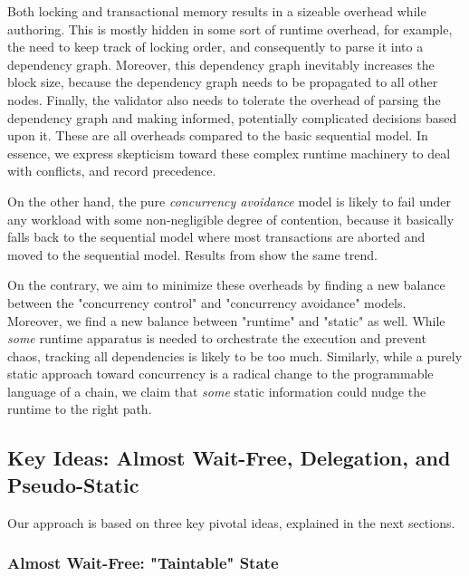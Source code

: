 Both locking and transactional memory results in a sizeable overhead while authoring. This is mostly
hidden in some sort of runtime overhead, for example, the need to keep track of locking order, and
consequently to parse it into a dependency graph. Moreover, this dependency graph inevitably
increases the block size, because the dependency graph needs to be propagated to all other nodes.
Finally, the validator also needs to tolerate the overhead of parsing the dependency graph and
making informed, potentially complicated decisions based upon it. These are all overheads compared
to the basic sequential model. In essence, we express skepticism toward these complex runtime
machinery to deal with conflicts, and record precedence.

On the other hand, the pure \textit{concurrency avoidance} model is likely to fail under any
workload with some non-negligible degree of contention, because it basically falls back to the
sequential model where most transactions are aborted and moved to the sequential model. Results from
\cite{saraphEmpiricalStudySpeculative2019} show the same trend.

On the contrary, we aim to minimize these overheads by finding a new balance between the
"concurrency control" and "concurrency avoidance" models. Moreover, we find a new balance between
"runtime" and "static" as well. While \textit{some} runtime apparatus is needed to orchestrate the
execution and prevent chaos, tracking all dependencies is likely to be too much. Similarly, while a
purely static approach toward concurrency is a radical change to the programmable language of a
chain, we claim that \textit{some} static information could nudge the runtime to the right path.

\subsection{Key Ideas: Almost Wait-Free, Delegation, and Pseudo-Static}

Our approach is based on three key pivotal ideas, explained in the next sections.

\subsubsection{Almost Wait-Free: "Taintable" State}\label{chapt_approach:subsubsec:taintable_state}

